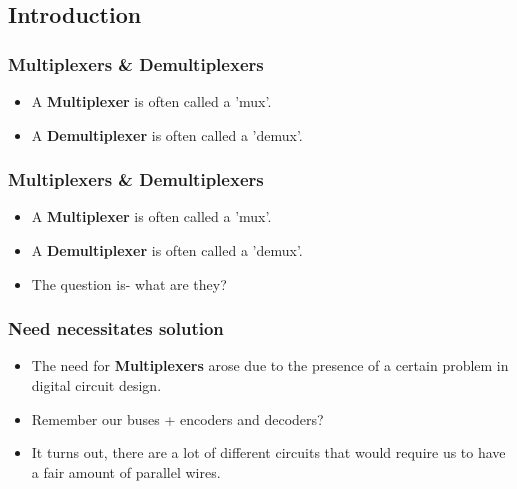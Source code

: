 \documentclass{beamer}
\begin{document}
    	\subsection{Introduction}
    	
    	\begin{frame}
    		\frametitle{Multiplexers \& Demultiplexers}
    		
    		\begin{itemize}
    			\item A \textbf{Multiplexer} is often called a 'mux'.
    			\item A \textbf{Demultiplexer} is often called a 'demux'.
    		\end{itemize}
    		
		\end{frame}  
		
		\begin{frame}
    		\frametitle{Multiplexers \& Demultiplexers}
    		
    		\begin{itemize}
    			\item A \textbf{Multiplexer} is often called a 'mux'.
    			\item A \textbf{Demultiplexer} is often called a 'demux'.
    			\item The question is- what are they?
    		\end{itemize}
    		
		\end{frame}
		
		\begin{frame}
			\frametitle{Need necessitates solution}
			\begin{itemize}
				\item The need for \textbf{Multiplexers} arose due to the presence of a certain problem in digital circuit design.
				\item Remember our buses + encoders and decoders?
				\item It turns out, there are a lot of different circuits that would require us to have a fair amount of parallel wires.
				
			\end{itemize}
		\end{frame}		 
		
\end{document}
